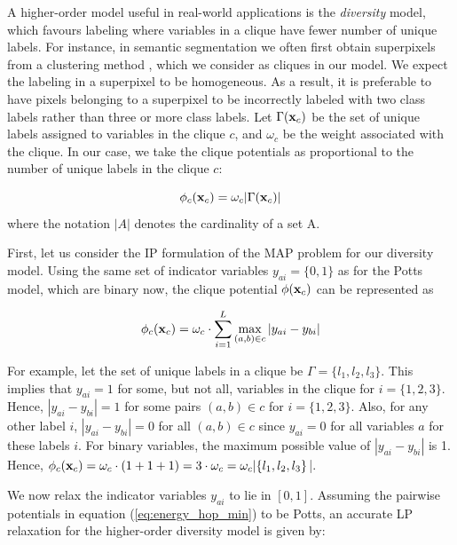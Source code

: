 A higher-order model useful in real-world applications is the
\textit{diversity} model, which favours labeling where variables in a clique
have fewer number of unique labels. For instance, in semantic segmentation we
often first obtain superpixels from a clustering method \cite{comaniciu2002mean}, which we consider as cliques in our model. We expect the labeling in a superpixel to be homogeneous. As a result, it is preferable to have pixels belonging to a superpixel to be incorrectly labeled with two class labels rather than three or more class labels. Let $\Gamma({\bf x}_c)$ be the set of unique labels assigned to variables in the clique $c$, and $\omega_c$ be the weight associated with the clique. In our case, we take the clique potentials as proportional to the number of unique labels in the clique $c$:
 
\begin{equation}
  \phi_c({\bf x}_c) = \omega_c|\Gamma({\bf x}_c)|
\label{eq:diversity_potential}
\end{equation}
where the notation $|A|$ denotes the cardinality of a set A.


First, let us consider the IP formulation of the MAP problem for our diversity model. Using the same set of indicator variables $y_{ai} = \{0, 1\}$ as for the Potts model, which are binary now, the clique potential $\phi({\bf x}_c)$ can be represented as

\begin{equation}
  \phi_c({\bf x}_c) = \omega_c \cdot \sum_{i = 1}^L \max_{(a, b) \in c} |y_{ai} - y_{bi}| 
\label{eq:hod_ip}
\end{equation}

For example, let the set of unique labels in a clique be $\Gamma = \{l_1, l_2, l_3\}$. This implies that $y_{ai} = 1$ for some, but not all, variables in the clique for $i = \{1, 2, 3\}$. Hence, $|y_{ai} - y_{bi}| = 1$ for some pairs $(a, b) \in c$ for $i = \{1, 2, 3\}$. Also, for any other label $i$, $|y_{ai} - y_{bi}| = 0$ for all $(a, b) \in c$ since $y_{ai} = 0$ for all variables $a$ for these labels $i$. For binary variables, the maximum possible value of $|y_{ai} - y_{bi}|$ is 1. Hence, $\phi_c({\bf x}_c) = \omega_c \cdot (1 + 1 + 1) = 3 \cdot \omega_c = \omega_c |\{l_1, l_2, l_3\}$|. 
 
We now relax the indicator variables $y_{ai}$ to lie in $[0, 1]$. Assuming the pairwise potentials in equation (\ref{eq:energy_hop_min}) to be Potts, an accurate LP relaxation for the higher-order diversity model is given by:

